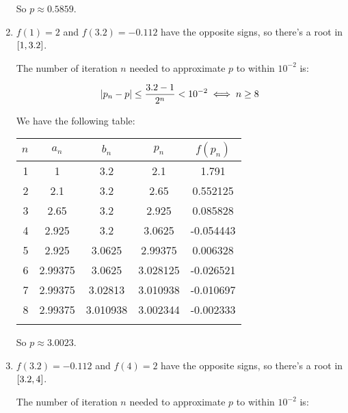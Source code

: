 \documentclass[../../Assignments.tex]{subfiles}
\begin{document}
\begin{solution}
\begin{enumerate}[label=(\alph*)]
            So \(p \approx \num{0.5859}\).

        \item \(f(1) = 2\) and \(f(\num{3.2}) = \num{-0.112}\) have the opposite
            signs, so there's a root in \(\interval{1}{\num{3.2}}\).

            The number of iteration \(n\) needed to approximate \(p\) to within
            \(10^{-2}\) is:

            \[\abs{p_n - p} \leq \frac{\num{3.2} - 1}{2^n} < 10^{-2} \iff n \geq 8\]

            We have the following table:

            \begin{tabular}{r S[table-format=1.5] S[table-format=1.6] S[table-format=1.6] S[table-format=-1.6]}
                \\
                \toprule
                \(n\)  &  {\(a_n\)}  &  {\(b_n\)}  &  {\(p_n\)}  &  {\(f(p_n)\)}  \\
                  &  1          &  3.2        &  2.1        &   1.791        \\
                    2  &  2.1        &  3.2        &  2.65       &   0.552125     \\
                    3  &  2.65       &  3.2        &  2.925      &   0.085828     \\
                    4  &  2.925      &  3.2        &  3.0625     &  -0.054443     \\
                    5  &  2.925      &  3.0625     &  2.99375    &   0.006328     \\
                    6  &  2.99375    &  3.0625     &  3.028125   &  -0.026521     \\
                    7  &  2.99375    &  3.02813    &  3.010938   &  -0.010697     \\
                    8  &  2.99375    &  3.010938   &  3.002344   &  -0.002333     \\
                \bottomrule
                \\
            \end{tabular}

            So \(p \approx \num{3.0023}\).

        \item \(f(\num{3.2}) = \num{-0.112}\) and \(f(4) = 2\) have the opposite
            signs, so there's a root in \(\interval{\num{3.2}}{4}\).

            The number of iteration \(n\) needed to approximate \(p\) to within
            \(10^{-2}\) is:


\end{enumerate}
\end{solution}
\end{document}
